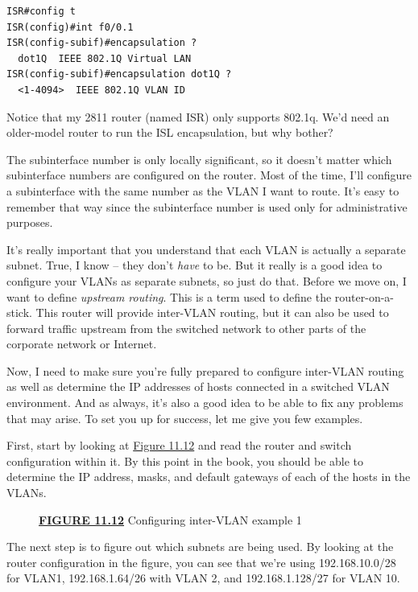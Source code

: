 \documentclass[b5paper,11pt]{memoir}
\begin{document}
\begin{verbatim}
ISR#config t
ISR(config)#int f0/0.1
ISR(config-subif)#encapsulation ?
  dot1Q  IEEE 802.1Q Virtual LAN
ISR(config-subif)#encapsulation dot1Q ?
  <1-4094>  IEEE 802.1Q VLAN ID
\end{verbatim}

Notice that my 2811 router (named ISR) only supports 802.1q. We'd need
an older-model router to run the ISL encapsulation, but why bother?

The subinterface number is only locally significant, so it doesn't
matter which subinterface numbers are configured on the router. Most of
the time, I'll configure a subinterface with the same number as the VLAN
I want to route. It's easy to remember that way since the subinterface
number is used only for administrative purposes.

It's really important that you understand that each VLAN is actually a
separate subnet. True, I know -- they don't \emph{have} to be. But it
really is a good idea to configure your VLANs as separate subnets, so
just do that. Before we move on, I want to define \emph{upstream
routing}. This is a term used to define the router-on-a-stick. This
router will provide inter-VLAN routing, but it can also be used to
forward traffic upstream from the switched network to other parts of the
corporate network or Internet.

Now, I need to make sure you're fully prepared to configure inter-VLAN
routing as well as determine the IP addresses of hosts connected in a
switched VLAN environment. And as always, it's also a good idea to be
able to fix any problems that may arise. To set you up for success, let
me give you few examples.

First, start by looking at
\protect\hyperlink{c11.xhtmlux5cux23figure11-12}{Figure 11.12} and read
the router and switch configuration within it. By this point in the
book, you should be able to determine the IP address, masks, and default
gateways of each of the hosts in the VLANs.



\begin{figure}
\centering
\caption{{\protect\hyperlink{c11.xhtmlux5cux23figureanchor11-12}{\textbf{FIGURE
11.12}} Configuring inter-VLAN example 1}}
\end{figure}

The next step is to figure out which subnets are being used. By looking
at the router configuration in the figure, you can see that we're using
192.168.10.0/28 for VLAN1, 192.168.1.64/26 with VLAN 2, and
192.168.1.128/27 for VLAN 10.
\end{document}
